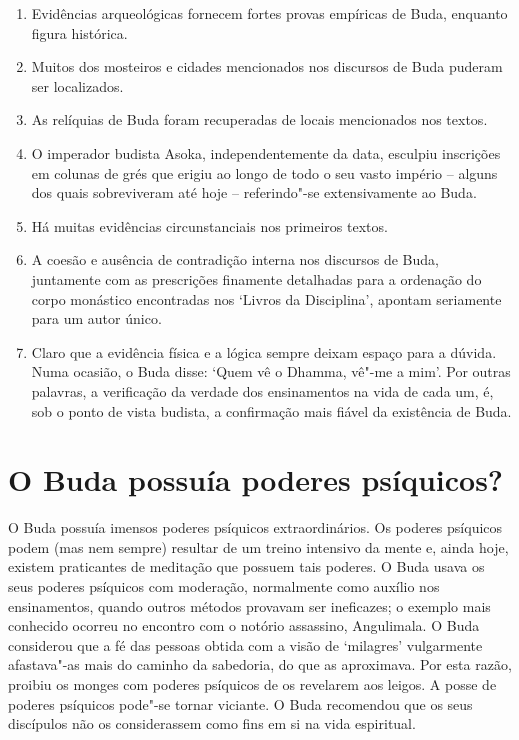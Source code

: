 \begin{enumerate}
\item
  Evidências arqueológicas fornecem fortes provas empíricas de Buda,
  enquanto figura histórica.
\item
  Muitos dos mosteiros e cidades mencionados nos discursos de Buda
  puderam ser localizados.
\item
  As relíquias de Buda foram recuperadas de locais mencionados nos
  textos.
\item
  O imperador budista Asoka, independentemente da data, esculpiu
  inscrições em colunas de grés que erigiu ao longo de todo o seu vasto
  império -- alguns dos quais sobreviveram até hoje -- referindo"-se
  extensivamente ao Buda.
\item
  Há muitas evidências circunstanciais nos primeiros textos.
\item
  A coesão e ausência de contradição interna nos discursos de Buda,
  juntamente com as prescrições finamente detalhadas para a ordenação do
  corpo monástico encontradas nos `Livros da Disciplina', apontam
  seriamente para um autor único.
\item
  Claro que a evidência física e a lógica sempre deixam espaço para a
  dúvida. Numa ocasião, o Buda disse: `Quem vê o Dhamma, vê"-me a mim'.
  Por outras palavras, a verificação da verdade dos ensinamentos na vida
  de cada um, é, sob o ponto de vista budista, a confirmação mais fiável
  da existência de Buda.
\end{enumerate}

\section{O Buda possuía poderes psíquicos?}

O Buda possuía imensos poderes psíquicos extraordinários. Os poderes
psíquicos podem (mas nem sempre) resultar de um treino intensivo da
mente e, ainda hoje, existem praticantes de meditação que possuem tais
poderes. O Buda usava os seus poderes psíquicos com moderação,
normalmente como auxílio nos ensinamentos, quando outros métodos
provavam ser ineficazes; o exemplo mais conhecido ocorreu no encontro
com o notório assassino, Angulimala. O Buda considerou que a fé das
pessoas obtida com a visão de `milagres' vulgarmente afastava"-as mais do
caminho da sabedoria, do que as aproximava. Por esta razão, proibiu os
monges com poderes psíquicos de os revelarem aos leigos. A posse de
poderes psíquicos pode"-se tornar viciante. O Buda recomendou que os seus
discípulos não os considerassem como fins em si na vida espiritual.

